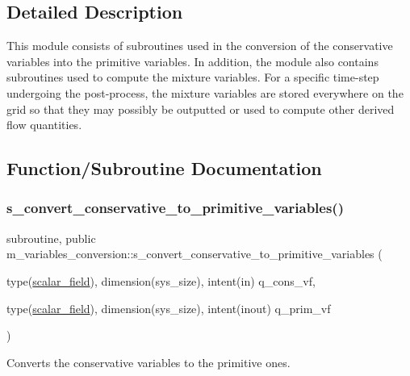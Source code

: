 \subsection{Detailed Description}
This module consists of subroutines used in the conversion of the conservative variables into the primitive variables. In addition, the module also contains subroutines used to compute the mixture variables. For a specific time-\/step undergoing the post-\/process, the mixture variables are stored everywhere on the grid so that they may possibly be outputted or used to compute other derived flow quantities. 

\subsection{Function/\+Subroutine Documentation}
\mbox{\label{namespacem__variables__conversion_abecd489e8c769f12646d2647fab7dd53}} 
\subsubsection{\texorpdfstring{s\+\_\+convert\+\_\+conservative\+\_\+to\+\_\+primitive\+\_\+variables()}{s\_convert\_conservative\_to\_primitive\_variables()}}
{\footnotesize\ttfamily subroutine, public m\+\_\+variables\+\_\+conversion\+::s\+\_\+convert\+\_\+conservative\+\_\+to\+\_\+primitive\+\_\+variables (\begin{DoxyParamCaption}\item[{type(\hyperlink{structm__derived__types_1_1scalar__field}{scalar\+\_\+field}), dimension(sys\+\_\+size), intent(in)}]{q\+\_\+cons\+\_\+vf,  }\item[{type(\hyperlink{structm__derived__types_1_1scalar__field}{scalar\+\_\+field}), dimension(sys\+\_\+size), intent(inout)}]{q\+\_\+prim\+\_\+vf }\end{DoxyParamCaption})}



Converts the conservative variables to the primitive ones. 



